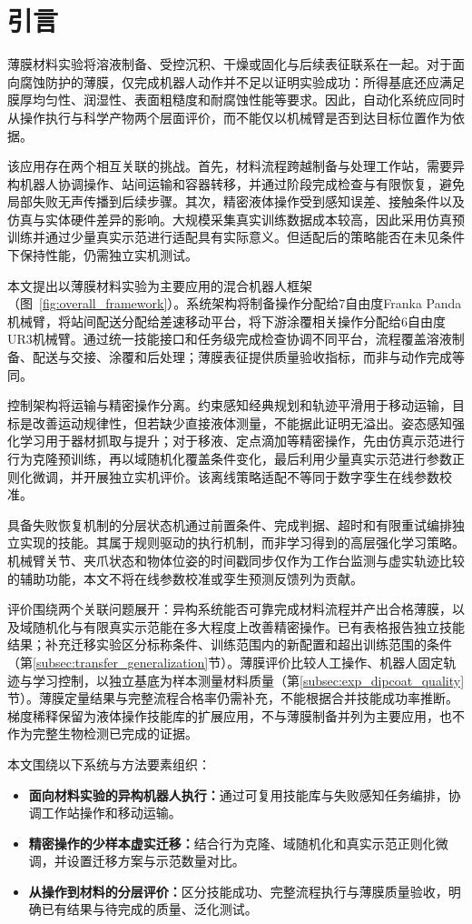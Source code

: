\section{引言}
\label{sec:introduction}

薄膜材料实验将溶液制备、受控沉积、干燥或固化与后续表征联系在一起。对于面向腐蚀防护的薄膜，仅完成机器人动作并不足以证明实验成功：所得基底还应满足膜厚均匀性、润湿性、表面粗糙度和耐腐蚀性能等要求。因此，自动化系统应同时从操作执行与科学产物两个层面评价，而不能仅以机械臂是否到达目标位置作为依据。

该应用存在两个相互关联的挑战。首先，材料流程跨越制备与处理工作站，需要异构机器人协调操作、站间运输和容器转移，并通过阶段完成检查与有限恢复，避免局部失败无声传播到后续步骤。其次，精密液体操作受到感知误差、接触条件以及仿真与实体硬件差异的影响。大规模采集真实训练数据成本较高，因此采用仿真预训练并通过少量真实示范进行适配具有实际意义。但适配后的策略能否在未见条件下保持性能，仍需独立实机测试。

本文提出以薄膜材料实验为主要应用的混合机器人框架（图~\ref{fig:overall_framework}）。系统架构将制备操作分配给7自由度Franka Panda机械臂，将站间配送分配给差速移动平台，将下游涂覆相关操作分配给6自由度UR3机械臂。通过统一技能接口和任务级完成检查协调不同平台，流程覆盖溶液制备、配送与交接、涂覆和后处理；薄膜表征提供质量验收指标，而非与动作完成等同。

控制架构将运输与精密操作分离。约束感知经典规划和轨迹平滑用于移动运输，目标是改善运动规律性，但若缺少直接液体测量，不能据此证明无溢出。姿态感知强化学习用于器材抓取与提升；对于移液、定点滴加等精密操作，先由仿真示范进行行为克隆预训练，再以域随机化覆盖条件变化，最后利用少量真实示范进行参数正则化微调，并开展独立实机评价。该离线策略适配不等同于数字孪生在线参数校准。

具备失败恢复机制的分层状态机通过前置条件、完成判据、超时和有限重试编排独立实现的技能。其属于规则驱动的执行机制，而非学习得到的高层强化学习策略。机械臂关节、夹爪状态和物体位姿的时间戳同步仅作为工作台监测与虚实轨迹比较的辅助功能，本文不将在线参数校准或孪生预测反馈列为贡献。

评价围绕两个关联问题展开：异构系统能否可靠完成材料流程并产出合格薄膜，以及域随机化与有限真实示范能在多大程度上改善精密操作。已有表格报告独立技能结果；补充迁移实验区分标称条件、训练范围内的新配置和超出训练范围的条件（第\ref{subsec:transfer_generalization}节）。薄膜评价比较人工操作、机器人固定轨迹与学习控制，以独立基底为样本测量材料质量（第\ref{subsec:exp_dipcoat_quality}节）。薄膜定量结果与完整流程合格率仍需补充，不能根据合并技能成功率推断。梯度稀释保留为液体操作技能库的扩展应用，不与薄膜制备并列为主要应用，也不作为完整生物检测已完成的证据。

本文围绕以下系统与方法要素组织：
\begin{itemize}
    \item \textbf{面向材料实验的异构机器人执行：}通过可复用技能库与失败感知任务编排，协调工作站操作和移动运输。
    \item \textbf{精密操作的少样本虚实迁移：}结合行为克隆、域随机化和真实示范正则化微调，并设置迁移方案与示范数量对比。
    \item \textbf{从操作到材料的分层评价：}区分技能成功、完整流程执行与薄膜质量验收，明确已有结果与待完成的质量、泛化测试。
\end{itemize}
